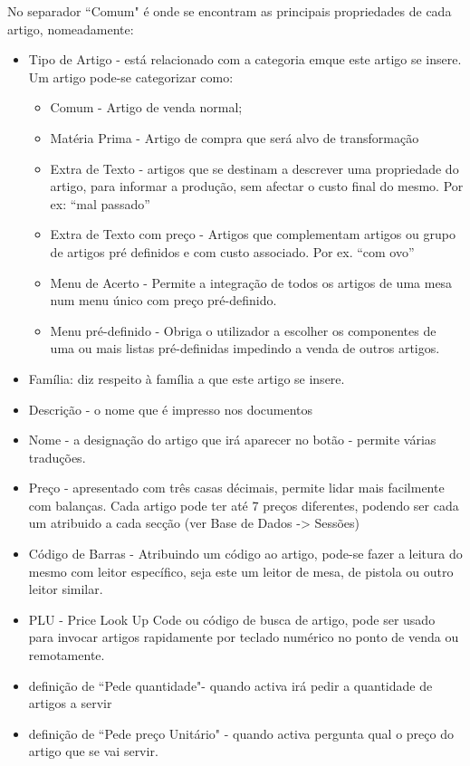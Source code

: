 \documentclass[a4paper,11pt,openany]{memoir}
\begin{document}
No separador “Comum" é onde se encontram as principais propriedades de cada artigo, nomeadamente:
\begin{itemize}
\item Tipo de Artigo - está relacionado com a categoria emque este artigo se insere. Um artigo pode-se categorizar como:
\begin{itemize}
\item Comum - Artigo de venda normal;
\item Matéria Prima - Artigo de compra que será alvo de transformação
\item Extra de Texto - artigos que se destinam a descrever uma propriedade do artigo, para informar a produção, sem afectar o custo final do mesmo. Por ex: “mal passado”
\item Extra de Texto com preço - Artigos que complementam artigos ou grupo de artigos pré definidos e com custo associado. Por ex. “com ovo”
\item Menu de Acerto - Permite a integração de todos os artigos de uma mesa num menu único com preço pré-definido.
\item Menu pré-definido - Obriga o utilizador a escolher os componentes de uma ou mais listas pré-definidas impedindo a venda de outros artigos.
\end {itemize}
\item Família: diz respeito à família a que este artigo se insere.
\item Descrição - o nome que é impresso nos documentos
\item Nome - a designação do artigo que irá aparecer no botão - permite várias traduções.
\item Preço - apresentado com três casas décimais, permite lidar mais facilmente com balanças. Cada artigo pode ter até 7 preços diferentes, podendo ser cada um atribuido a cada secção (ver Base de Dados -> Sessões)
\item Código de Barras - Atribuindo um código ao artigo, pode-se fazer a leitura do mesmo com leitor específico, seja este um leitor de mesa, de pistola ou outro leitor similar.
\item PLU - Price Look Up Code ou código de busca de artigo, pode ser usado para invocar artigos rapidamente por teclado numérico no ponto de venda ou remotamente.
\item definição de “Pede quantidade"- quando activa irá pedir a quantidade de artigos a servir
\item definição de “Pede preço Unitário" - quando activa pergunta qual o preço do artigo que se vai servir.
\end {itemize}
\end{document}
